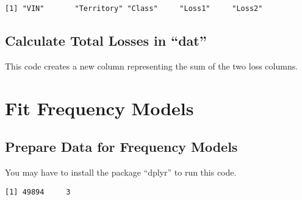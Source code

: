 \documentclass[]{book}
\newenvironment{Shaded}{\begin{snugshade}}{\end{snugshade}}
\newcommand{\KeywordTok}[1]{\textcolor[rgb]{0.13,0.29,0.53}{\textbf{#1}}}
\newcommand{\DataTypeTok}[1]{\textcolor[rgb]{0.13,0.29,0.53}{#1}}
\newcommand{\DecValTok}[1]{\textcolor[rgb]{0.00,0.00,0.81}{#1}}
\newcommand{\StringTok}[1]{\textcolor[rgb]{0.31,0.60,0.02}{#1}}
\newcommand{\OperatorTok}[1]{\textcolor[rgb]{0.81,0.36,0.00}{\textbf{#1}}}
\newcommand{\NormalTok}[1]{#1}
\theoremstyle{definition}
\theoremstyle{definition}
\theoremstyle{definition}
\theoremstyle{remark}
\begin{document}
\begin{verbatim}
[1] "VIN"       "Territory" "Class"     "Loss1"     "Loss2"    
\end{verbatim}

\subsection{\texorpdfstring{Calculate Total Losses in
``dat''}{Calculate Total Losses in dat}}\label{calculate-total-losses-in-dat}

This code creates a new column representing the sum of the two loss
columns.

\begin{Shaded}
\end{Shaded}

\section{Fit Frequency Models}\label{fit-frequency-models}

\subsection{Prepare Data for Frequency
Models}\label{prepare-data-for-frequency-models}

You may have to install the package ``dplyr'' to run this code.

\begin{Shaded}
\end{Shaded}

\begin{verbatim}
[1] 49894     3
\end{verbatim}
\end{document}
